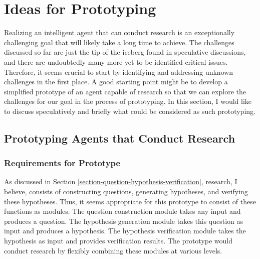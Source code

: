 

\section{Ideas for Prototyping}
Realizing an intelligent agent that can conduct research is an exceptionally challenging goal that will likely take a long time to achieve. The challenges discussed so far are just the tip of the iceberg found in speculative discussions, and there are undoubtedly many more yet to be identified critical issues. Therefore, it seems crucial to start by identifying and addressing unknown challenges in the first place. A good starting point might be to develop a simplified prototype of an agent capable of research so that we can explore the challenges for our goal in the process of prototyping. In this section, I would like to discuss speculatively and briefly what could be considered as such prototyping.

\subsection{Prototyping Agents that Conduct Research}

\subsubsection{Requirements for Prototype}
As discussed in Section \ref{section-question-hypothesis-verification}, research, I believe, consists of constructing questions, generating hypotheses, and verifying these hypotheses. Thus, it seems appropriate for this prototype to consist of these functions as modules. The question construction module takes any input and produces a question. The hypothesis generation module takes this question as input and produces a hypothesis. The hypothesis verification module takes the hypothesis as input and provides verification results. The prototype would conduct research by flexibly combining these modules at various levels.

